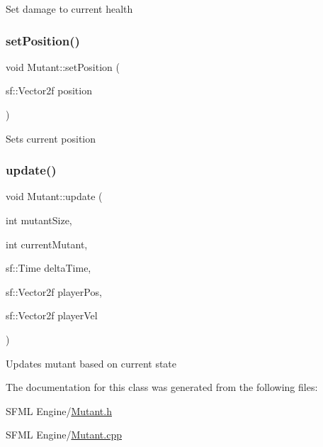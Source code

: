 Set damage to current health \mbox{\label{class_mutant_a10a34b2ddc9177b0da17fa8bc77d48c7}} 
\subsubsection{\texorpdfstring{set\+Position()}{setPosition()}}
{\footnotesize\ttfamily void Mutant\+::set\+Position (\begin{DoxyParamCaption}\item[{sf\+::\+Vector2f}]{position }\end{DoxyParamCaption})}

Sets current position \mbox{\label{class_mutant_aa334f3574bc0a367e0cc722a900b35da}} 
\subsubsection{\texorpdfstring{update()}{update()}}
{\footnotesize\ttfamily void Mutant\+::update (\begin{DoxyParamCaption}\item[{int}]{mutant\+Size,  }\item[{int}]{current\+Mutant,  }\item[{sf\+::\+Time}]{delta\+Time,  }\item[{sf\+::\+Vector2f}]{player\+Pos,  }\item[{sf\+::\+Vector2f}]{player\+Vel }\end{DoxyParamCaption})}

Updates mutant based on current state 

The documentation for this class was generated from the following files\+:\begin{DoxyCompactItemize}
\item 
S\+F\+M\+L Engine/\hyperlink{_mutant_8h}{Mutant.\+h}\item 
S\+F\+M\+L Engine/\hyperlink{_mutant_8cpp}{Mutant.\+cpp}\end{DoxyCompactItemize}
